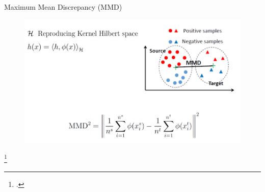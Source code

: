 \documentclass{beamer}
\begin{document}
\begin{frame}
{Maximum Mean Discrepancy (MMD)}
\begin{figure}
\centering
\includegraphics[width=\textwidth]{figs/MMD.png}
\end{figure}
\footcite{borgwardt2006integrating}
\end{frame}
\end{document}

